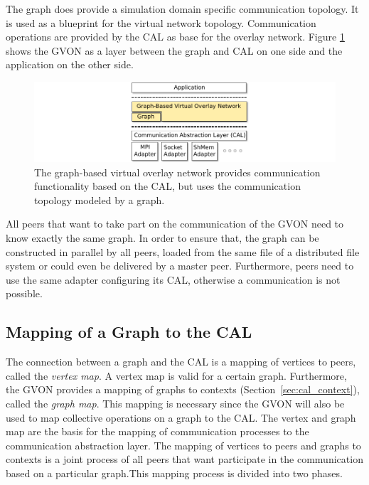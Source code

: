 The graph does provide a simulation domain specific communication
topology.  It is used as a blueprint for the virtual network topology.
Communication operations are provided by the CAL as base for the
overlay network.  Figure \ref{fig:gvon} shows the GVON as a layer
between the graph and CAL on one side and the application on the other
side.

\begin{figure}[H]
  \centering \includegraphics[width=\textwidth]{graphics/30_gvon}
  \caption{The graph-based virtual overlay network provides
    communication functionality based on the CAL, but uses the
    communication topology modeled by a graph.}
  \label{fig:gvon}
\end{figure}

\noindent All peers that want to take part on the communication of the GVON need
to know exactly the same graph. In order to ensure that, the graph can be
constructed in parallel by all peers, loaded from the same file of a
distributed file system or could even be delivered by a master
peer. Furthermore, peers need to use the same adapter configuring its
CAL, otherwise a communication is not possible.


\subsection{Mapping of a Graph to the CAL}
\label{sec:mapping}
The connection between a graph and the CAL is a mapping of vertices
to peers, called the \emph{vertex map}.  A vertex map is valid for a
certain graph. Furthermore, the GVON provides a mapping of  graphs
to contexts (Section~\ref{sec:cal_context}), called the \emph{graph
  map}. This mapping is necessary since the GVON will also be used to
map collective operations on a graph to the CAL.  The vertex and
graph map are the basis for the mapping of communication processes
to the communication abstraction layer.  The mapping of vertices to
peers and graphs to contexts is a joint process of all peers that want
participate in the communication based on a particular graph.This
mapping process is divided into two phases.

